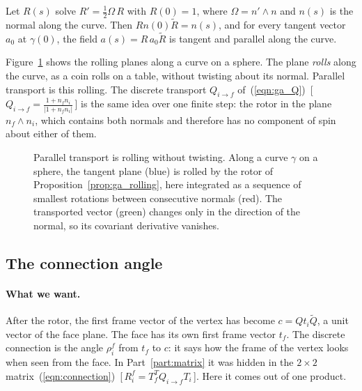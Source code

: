 \begin{prop}
\label{prop:ga_rolling}
Let $R(s)$ solve $R' = \frac12 \Omega\, R$ with $R(0) = 1$, where $\Omega = n' \wedge n$ and $n(s)$ is the normal along the curve. Then $R n(0) \widetilde R = n(s)$, and for every tangent vector $a_0$ at $\gamma(0)$, the field $a(s) = R\, a_0 \widetilde R$ is tangent and parallel along the curve.
\end{prop}
Figure~\ref{fig:rolling} shows the rolling planes along a curve on a sphere. The plane \emph{rolls} along the curve, as a coin rolls on a table, without twisting about its normal. Parallel transport is this rolling. The discrete transport $Q_{i \to f}$ of~(\ref{eqn:ga_Q})~[\,$Q_{i\to f} = \frac{1 + n_fn_i}{|1 + n_fn_i|}$\,] is the same idea over one finite step: the rotor in the plane $n_f \wedge n_i$, which contains both normals and therefore has no component of spin about either of them.
\begin{figure}[t]
\centering
{}
\caption{Parallel transport is rolling without twisting. Along a curve $\gamma$ on a sphere, the tangent plane (blue) is rolled by the rotor of Proposition~\ref{prop:ga_rolling}, here integrated as a sequence of smallest rotations between consecutive normals (red). The transported vector (green) changes only in the direction of the normal, so its covariant derivative vanishes.}
\label{fig:rolling}
\end{figure}

\subsection{The connection angle}

\paragraph{What we want.} After the rotor, the first frame vector of the vertex has become $c = Q t_i\widetilde Q$, a unit vector of the face plane. The face has its own first frame vector $t_f$. The discrete connection is the angle $\rho_i^f$ from $t_f$ to $c$: it says how the frame of the vertex looks when seen from the face. In Part~\ref{part:matrix} it was hidden in the $2\times 2$ matrix~(\ref{eqn:connection})~[\,$R_i^f = T_f^T Q_{i\to f} T_i$\,]. Here it comes out of one product.

